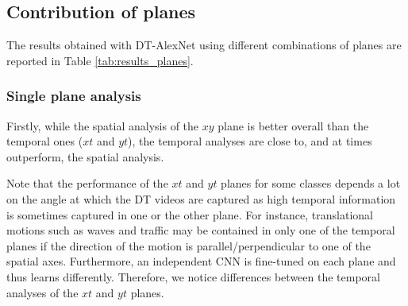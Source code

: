 \documentclass[a4paper,11pt]{article}
\begin{document}
\begin{table*}[!t]
\caption{Accuracy results (\%) on DT datasets of the proposed DT-AlexNet using various combinations of planes.} \label{tab:results_planes}
\centering
{}
\end{table*}

\subsection{Contribution of planes}%
The results obtained with DT-AlexNet using different combinations of planes are reported in Table \ref{tab:results_planes}.
\subsubsection{Single plane analysis}\leavevmode \par
Firstly, while the spatial analysis of the $xy$ plane is better overall than the temporal ones ($xt$ and $yt$), the temporal analyses are close to, and at times outperform, the spatial analysis.

Note that the performance of the $xt$ and $yt$ planes for some classes depends a lot on the angle at which the DT videos are captured as high temporal information is sometimes captured in one or the other plane.
For instance, translational motions such as waves and traffic may be contained in only one of the temporal planes if the direction of the motion is parallel/perpendicular to one of the spatial axes.
Furthermore, an independent CNN is fine-tuned on each plane and thus learns differently.
Therefore, we notice differences between the temporal analyses of the $xt$ and $yt$ planes.
\end{document}
